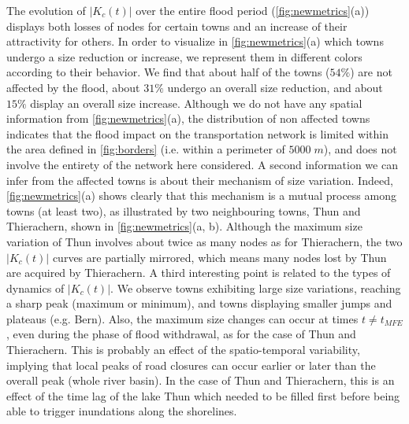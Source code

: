 \documentclass[twocolumn,fleqn,10pt]{wlscirep}
\begin{document}
The evolution of $|K_c(t)|$ over the entire flood period (\cref{fig:newmetrics}(a)) displays both losses of nodes for certain towns and an increase of their attractivity for others. In order to visualize in \cref{fig:newmetrics}(a) which towns 
undergo a size reduction or increase, we represent them in different colors according to their behavior. We find that about half of the towns ($54 \%$) are not affected by the flood, about $31 \%$ undergo an overall size reduction, and about $15 \%$ display an overall size increase. Although we do not have any spatial information from \cref{fig:newmetrics}(a), the distribution of non affected towns indicates that the flood impact on the transportation network is limited within the area defined in \cref{fig:borders} (i.e. within a perimeter of $5000 \; m$), and does not involve the entirety of the network here considered. A second information we can infer from the affected towns is about their mechanism of size variation. Indeed, \cref{fig:newmetrics}(a) shows clearly that this mechanism is a mutual process among towns (at least two), as illustrated by two neighbouring towns, Thun and Thierachern, shown in \cref{fig:newmetrics}(a, b). Although the maximum size variation of Thun involves about twice as many nodes as for Thierachern, the two $|K_c(t)|$ curves are partially mirrored, which means many nodes lost by Thun are acquired by Thierachern. A third interesting point is related to the types of dynamics of $|K_c(t)|$. We observe towns exhibiting large size variations, reaching a sharp peak (maximum or minimum), and towns displaying  smaller jumps and plateaus (e.g. Bern). Also, the maximum size changes can occur at times $t \neq t_{MFE}$, even during the phase of flood withdrawal, as for the case of Thun and Thierachern. This is probably an effect of the spatio-temporal variability, implying that local peaks of road closures can occur earlier or later than the overall peak (whole river basin). In the case of Thun and Thierachern\textcolor{black}{,} this is an effect of the time lag of the lake Thun which needed to be filled first before being able to trigger inundations along the shorelines.
\end{document}
